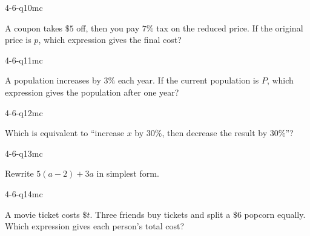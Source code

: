 \begin{practiceQuestion}{4-6-q10}{mc}
\begin{questionText}
A coupon takes $\$5$ off, then you pay $7\%$ tax on the reduced price. If the original price is $p$, which expression gives the final cost?
\end{questionText}
\end{practiceQuestion}

\begin{practiceQuestion}{4-6-q11}{mc}
\begin{questionText}
A population increases by $3\%$ each year. If the current population is $P$, which expression gives the population after one year?
\end{questionText}
\end{practiceQuestion}

\begin{practiceQuestion}{4-6-q12}{mc}
\begin{questionText}
Which is equivalent to ``increase $x$ by $30\%$, then decrease the result by $30\%$''?
\end{questionText}
\end{practiceQuestion}

\begin{practiceQuestion}{4-6-q13}{mc}
\begin{questionText}
Rewrite $5(a - 2) + 3a$ in simplest form.
\end{questionText}
\end{practiceQuestion}

\begin{practiceQuestion}{4-6-q14}{mc}
\begin{questionText}
A movie ticket costs $\$t$. Three friends buy tickets and split a $\$6$ popcorn equally. Which expression gives each person's total cost?
\end{questionText}
\end{practiceQuestion}

